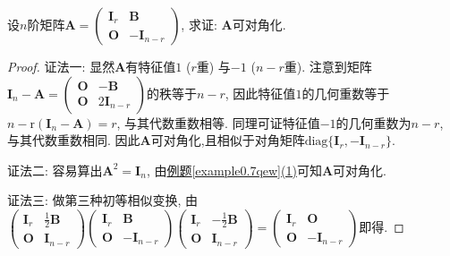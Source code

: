 \documentclass[../../main.tex]{subfiles}%
\begin{document}
\begin{example}
设\(n\)阶矩阵\(\boldsymbol{A} = \begin{pmatrix}
\boldsymbol{I}_r&\boldsymbol{B}\\
\boldsymbol{O}&-\boldsymbol{I}_{n - r}
\end{pmatrix}\), 求证: \(\boldsymbol{A}\)可对角化.
\end{example}
\begin{proof}

{\color{blue}证法一:}
显然\(\boldsymbol{A}\)有特征值\(1\) (\(r\)重) 与\(-1\) (\(n - r\)重). 注意到矩阵\(\boldsymbol{I}_n - \boldsymbol{A} = \begin{pmatrix}
\boldsymbol{O}&-\boldsymbol{B}\\
\boldsymbol{O}&2\boldsymbol{I}_{n - r}
\end{pmatrix}\)的秩等于\(n - r\), 因此特征值\(1\)的几何重数等于\(n - \mathrm{r}(\boldsymbol{I}_n - \boldsymbol{A}) = r\), 与其代数重数相等. 同理可证特征值\(-1\)的几何重数为\(n - r\), 与其代数重数相同. 因此\(\boldsymbol{A}\)可对角化,且相似于对角矩阵\(\mathrm{diag}\{\boldsymbol{I}_r,-\boldsymbol{I}_{n - r}\}\). 

{\color{blue}证法二:}
容易算出\(\boldsymbol{A}^2 = \boldsymbol{I}_n\), 由\hyperref[example0.7qew]{例题\ref{example0.7qew}(1)}可知\(\boldsymbol{A}\)可对角化.

{\color{blue}证法三:}
做第三种初等相似变换,
由\(\begin{pmatrix}
\boldsymbol{I}_r&\frac{1}{2}\boldsymbol{B}\\
\boldsymbol{O}&\boldsymbol{I}_{n - r}
\end{pmatrix}
\begin{pmatrix}
\boldsymbol{I}_r&\boldsymbol{B}\\
\boldsymbol{O}&-\boldsymbol{I}_{n - r}
\end{pmatrix}
\begin{pmatrix}
\boldsymbol{I}_r&-\frac{1}{2}\boldsymbol{B}\\
\boldsymbol{O}&\boldsymbol{I}_{n - r}
\end{pmatrix}
=
\begin{pmatrix}
\boldsymbol{I}_r&\boldsymbol{O}\\
\boldsymbol{O}&-\boldsymbol{I}_{n - r}
\end{pmatrix}\)即得. 
\end{proof}
\end{document}
